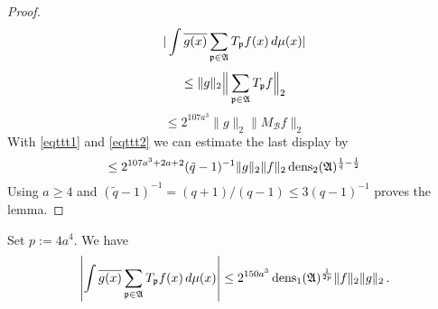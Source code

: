 \begin{proof}
 \begin{equation}
     |\int \overline{g(x)} \sum_{{\mathfrak p} \in \mathfrak{A}} T_{{\mathfrak p}} f(x)\, d\mu(x)|
\end{equation}
 \begin{equation}
     \le \|g\|_2 \Big\| \sum_{{\mathfrak p} \in \mathfrak{A}} T_{{\mathfrak p}} f \Big\|_2
\end{equation}
 \begin{equation}
     \le 2^{107a^3}\|g\|_2 \| M_{\mathcal{B}}f \|_2
\end{equation}
With \eqref{eqttt1} and
\eqref{eqttt2} we can estimate the last display by
\begin{equation}
    \le 2^{107a^3+2a+2}(\tilde{q}-1)^{-1} \|g\|_2 \|f\|_2\operatorname{\operatorname{dens}}_2(\mathfrak{A})^{\frac 1{\tilde{q}}-\frac 12}
\end{equation}
Using $a\ge 4$ and
$(\tilde q - 1)^{-1} = (q+1)/(q-1) \le 3(q-1)^{-1}$
proves the lemma.
\end{proof}


\begin{lemma}\label{dens1-antichain}
Set $p:=4a^4$. We have
    \begin{equation}\label{eqttt3}
  \left|\int \overline{g(x)} \sum_{{\mathfrak p} \in \mathfrak{A}} T_{{\mathfrak p}} f(x)\, d\mu(x)\right|\le
   2^{150a^3}\operatorname{\operatorname{dens}}_1(\mathfrak{A})^{\frac 1{2p}} \|f\|_2\|g\|_2\,.
\end{equation}
\end{lemma}



